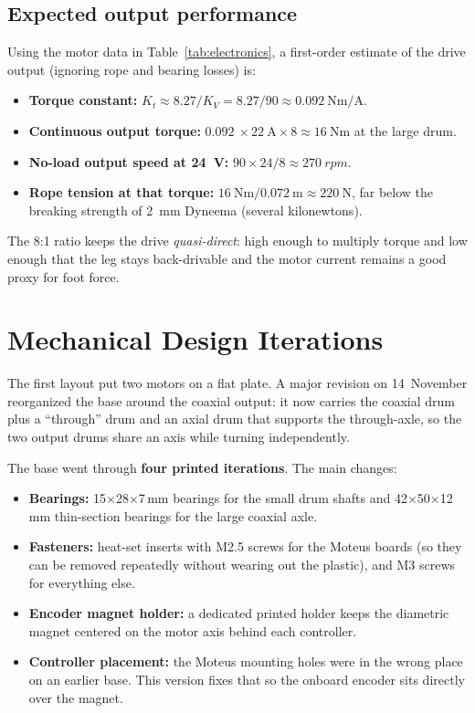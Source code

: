 \documentclass[11pt]{article}
\begin{document}
\subsection{Expected output performance}

Using the motor data in Table~\ref{tab:electronics}, a first-order estimate of
the drive output (ignoring rope and bearing losses) is:
\begin{itemize}
  \item \textbf{Torque constant:} $K_t \approx 8.27/K_V = 8.27/90 \approx
        \SI{0.092}{\newton\metre\per\ampere}$.
  \item \textbf{Continuous output torque:} $\SI{0.092}{} \times \SI{22}{\ampere}
        \times 8 \approx \SI{16}{\newton\metre}$ at the large drum.
  \item \textbf{No-load output speed at \SI{24}{\volt}:}
        $90 \times 24 / 8 \approx \SI{270}{rpm}$.
  \item \textbf{Rope tension at that torque:}
        $\SI{16}{\newton\metre} / \SI{0.072}{\metre} \approx \SI{220}{\newton}$,
        far below the breaking strength of \SI{2}{\milli\metre} Dyneema
        (several kilonewtons).
\end{itemize}
The 8:1 ratio keeps the drive \emph{quasi-direct}: high enough to multiply
torque and low enough that the leg stays back-drivable and the motor current
remains a good proxy for foot force.

\section{Mechanical Design Iterations}

The first layout put two motors on a flat plate. A major revision on 14~November
reorganized the base around the coaxial output: it now carries the coaxial drum
plus a ``through'' drum and an axial drum that supports the through-axle, so the
two output drums share an axis while turning independently.

The base went through \textbf{four printed iterations}. The main changes:
\begin{itemize}
  \item \textbf{Bearings:} 15$\times$28$\times$7\,mm bearings for the small
        drum shafts and 42$\times$50$\times$12\,mm thin-section bearings for
        the large coaxial axle.
  \item \textbf{Fasteners:} heat-set inserts with M2.5 screws for the Moteus
        boards (so they can be removed repeatedly without wearing out the
        plastic), and M3 screws for everything else.
  \item \textbf{Encoder magnet holder:} a dedicated printed holder keeps the
        diametric magnet centered on the motor axis behind each controller.
  \item \textbf{Controller placement:} the Moteus mounting holes were in the
        wrong place on an earlier base. This version fixes that so the onboard
        encoder sits directly over the magnet.
\end{itemize}
\end{document}
